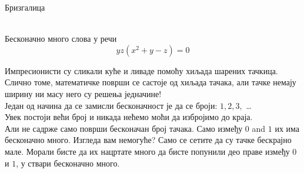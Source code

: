 \documentclass[en]{./../../common/SurferDesc}%
\begin{document}
\footnotesize


\begin{surferPage}
  \begin{surferTitle}Бризгалица\end{surferTitle}   \\
Бесконачно много слова у речи\\
\smallskip
\[y z (x^2	+ y - z)	= 0\]

\vspace{0.3cm}
Импресионисти су сликали куће и ливаде помоћу хиљада шарених тачкица. Слично томе, математичке површи се састоје од хиљада тачака, али тачке немају ширину ни масу него су решења једначине! \\
\vspace{0.3cm}
Један од начина да се замисли бесконачност је да се броји: $1, 2, 3,$ \dots\\
Увек постоји већи број и никада нећемо моћи да избројимо до краја.\\
\vspace{0.3cm}
Али не садрже само површи бесконачан број тачака. Само између $0$ and $1$ их има бесконачно много. Изгледа вам немогуће? Само се сетите да су тачке бескрајно мале. Морали бисте да их нацртате много да бисте попунили део праве између $0$ и $1$, у ствари бесконачно много.




  \begin{surferText}
     \end{surferText}
\end{surferPage}
\end{document}
